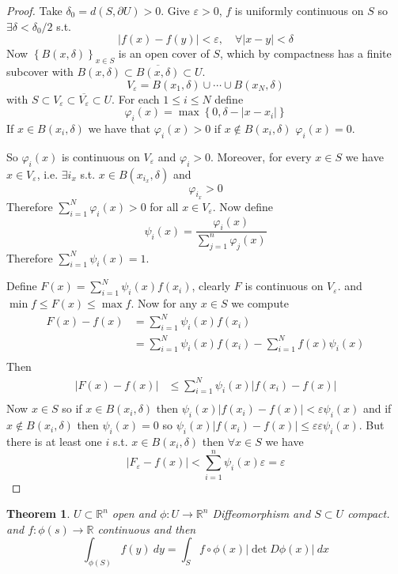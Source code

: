 \documentclass[11pt,a4paper]{article}
\theoremstyle{definition}
\theoremstyle{plain}
\newtheorem{theorem}[definition]{Theorem}
\theoremstyle{remark}
\newcommand{\R}{\mathbb{R}}
\renewcommand{\set}[1]{\left\{ #1 \right\}}
\newcommand{\abs}[1]{\lvert #1 \rvert}
\begin{document}
\begin{proof}
    Take $\delta_0 = d(S, \partial U) > 0$. Give $\varepsilon > 0$, $f$ is uniformly continuous on $S$
    so $\exists \delta < \delta_0 / 2$ s.t. 
    $$\abs{f(x) - f(y)} < \varepsilon, \quad \forall \abs{x-y} < \delta$$
    Now $\set{B(x,\delta)}_{x \in S}$ is an open cover of $S$, which by compactness has a finite subcover 
    with $B(x,\delta) \subset \overline{B(x,\delta)} \subset U$. 
    $$V_\varepsilon = B(x_1, \delta) \cup \cdots \cup B(x_N, \delta)$$
    with $S \subset V_\varepsilon \subset \overline{V_\varepsilon} \subset U$. 
    For each $1 \le i \le N$ define 
    $$\varphi_i(x) = \max \set{0, \delta - \abs{x-x_i}}$$
    If $x \in B(x_i, \delta)$ we have that $\varphi_i (x) > 0$ if 
    $x \not\in B(x_i, \delta)$ $\varphi_i(x) = 0$. 

    So $\varphi_i(x)$ is continuous on $V_\varepsilon$ and $\varphi_i > 0$. Moreover, for 
    every $x \in S$ we have $x \in V_\varepsilon$, i.e. $\exists i_x$ s.t. 
    $x \in B(x_{i_x}, \delta)$ and 
    $$\varphi_{i_x} > 0$$
    Therefore $\sum_{i=1}^N \varphi_i (x) > 0$ for all $x \in V_\varepsilon$. 
    Now define 
    $$\psi_i (x) = \frac{\varphi_i(x)}{\sum_{j=1}^n \varphi_j(x)}$$
    Therefore $\sum_{i=1}^N \psi_i(x) = 1$. 
    
    Define $F(x) = \sum_{i=1}^N \psi_i(x) f (x_i)$, clearly $F$ is continuous on $V_\varepsilon$. 
    and $\min f \le F(x) \le \max f$. Now for any $x \in S$ we compute 
    \begin{align*}
        F(x) - f(x) &= \sum_{i=1}^N \psi_i(x) f(x_i) \\
        &= \sum_{i=1}^N \psi_i(x) f(x_i) - \sum_{i=1}^N f(x) \psi_i(x) \\
    \end{align*}
    Then 
    \begin{align*}
        \abs{F(x) - f(x)} &\le \sum_{i=1}^N \psi_i(x) \abs{f(x_i) - f(x)} \\
    \end{align*}
    Now $x \in S$ so if $x \in B(x_i, \delta)$ then $\psi_i(x) \abs{f(x_i) - f(x)} < \varepsilon \psi_i(x)$ 
    and if $x \not\in B(x_i, \delta)$ then $\psi_i(x) = 0$ so $\psi_i(x) \abs{f(x_i) - f(x)} \le \varepsilon\varepsilon \psi_i(x)$. 
    But there is at least one $i$ s.t. $x \in B(x_i, \delta)$ then $\forall x \in S$ we have 
    $$\abs{F_\varepsilon - f(x)} < \sum_{i=1}^n \psi_i(x) \varepsilon = \varepsilon$$
\end{proof}

\begin{theorem}
    $U \subset \R^n$ open and $\phi \colon U \to \R^n$ Diffeomorphism and $S \subset U$ compact. 
    and $f \colon \phi(s) \to \R$ continuous and then 
    $$\int_{\phi(S)} f(y) \ dy = \int_S f \circ \phi (x) \abs{\det D\phi(x)} \ dx$$ 
\end{theorem}
\end{document}
